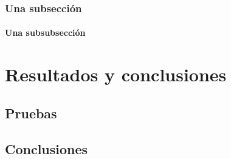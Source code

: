 \documentclass[a4paper, 12pt]{report} %
\begin{document}
\subsection{Una subsección}

\subsubsection{Una subsubsección}

\chapter{Resultados y conclusiones}

\section{Pruebas}

\section{Conclusiones}

\printbibliography[heading=bibnumbered] %
\end{document}
